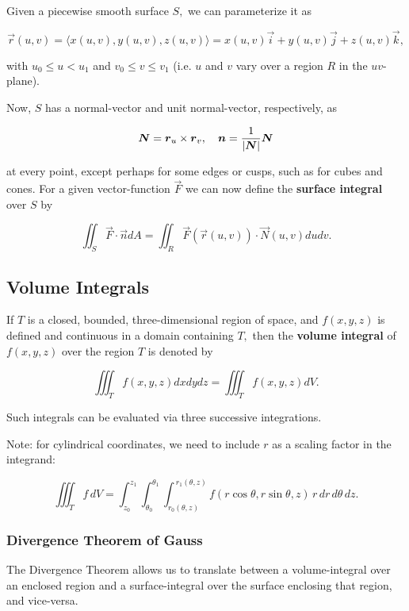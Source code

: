 \documentclass{article}
\begin{document}
\begin{definition}
Given a piecewise \@{smooth} surface $S,$ we can parameterize it as

\[ \vec{r}(u,v) = \langle x(u,v), y(u,v), z(u,v) \rangle = x(u,v) \vec{i} + y(u,v) \vec{j} + z(u,v) \vec{k}, \]

with $u_0 \leq u < u_1$ and $v_0 \leq v \leq v_1$ (i.e. $u$ and $v$ vary over a region $R$ in the $uv$-plane).

Now, $S$ has a \@{normal-vector} and \@{unit} \@{normal-vector}, respectively, as

\[ \boldsymbol{N} = \boldsymbol{r}_u \times \boldsymbol{r}_v, \quad \boldsymbol{n} = \frac{1}{\left| \boldsymbol{N} \right|} \boldsymbol{N} \]

at every point, except perhaps for some edges or cusps, such as for cubes and cones. For a given \@{vector-function} $\vec{F}$ we can now define the \textbf{surface integral} over $S$ by

\[ \iint_S \vec{F} \cdot \vec{n} dA = \iint_R \vec{F}(\vec{r}(u,v)) \cdot \vec{N}(u,v) du dv. \]
\end{definition}

\subsection{Volume Integrals}

\begin{definition}
If $T$ is a closed, \@{bounded}, three-dimensional region of space, and $f(x,y,z)$ is defined and \@{continuous} in a \@{domain} containing $T,$ then the \textbf{volume integral} of $f(x,y,z)$ over the region $T$ is denoted by

\[ \iiint_T f(x,y,z) dx dy dz = \iiint_T f(x,y,z) dV. \]

Such integrals can be evaluated via three successive integrations.
\end{definition}

Note: for cylindrical coordinates, we need to include $r$ as a scaling factor in the integrand:

\[ \iiint_T f\,dV
=\int_{z_0}^{z_1}\!\int_{\theta_0}^{\theta_1}\!\int_{r_0(\theta,z)}^{\,r_1(\theta,z)}
f(r\cos\theta,r\sin\theta,z)\, r\, dr\, d\theta\, dz. \]

\subsubsection{Divergence Theorem of Gauss}
The Divergence Theorem allows us to translate between a \@{volume-integral} over an enclosed region and a \@{surface-integral} over the surface enclosing that region, and vice-versa.
\end{document}
